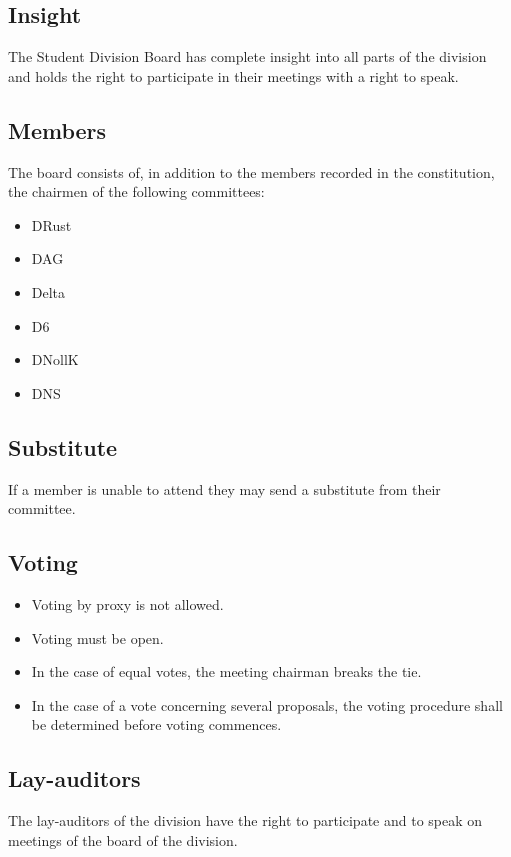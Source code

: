 \subsection{Insight} 
The Student Division Board has complete insight into all parts of the division and holds the right to participate in their meetings with a right to speak. 

\subsection{Members}
The board consists of, in addition to the members recorded in the constitution, the chairmen of the following committees:
\begin{itemize}
  \item DRust
  \item DAG 
  \item Delta 
  \item D6 
  \item DNollK
  \item DNS
\end{itemize}

\subsection{Substitute} 
If a member is unable to attend they may send a substitute from their committee. 

\subsection{Voting} 

\begin{itemize}
  \item Voting by proxy is not allowed.
  \item Voting must be open.
  \item In the case of equal votes, the meeting chairman breaks the tie.
  \item In the case of a vote concerning several proposals, the voting procedure shall be determined before voting commences.
\end{itemize}

\subsection{Lay-auditors}
The lay-auditors of the division have the right to participate and to speak on meetings of the board of the division.

\newpage
